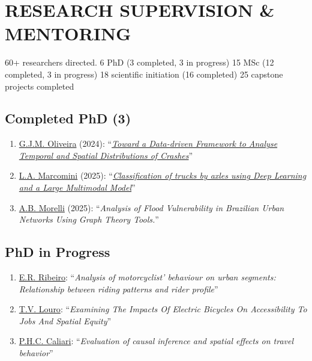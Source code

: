 \documentclass[
  10pt,
  a4paper,
  DIV=11,
  numbers=noendperiod]{scrartcl}
\providecommand{\tightlist}{%
  \setlength{\itemsep}{0pt}\setlength{\parskip}{0pt}}
\begin{document}
\hrulefill

\section{RESEARCH SUPERVISION \&
MENTORING}\label{research-supervision-mentoring}

\begin{description}
\tightlist
\item[\textbf{Summary}]
60+ researchers directed. 6 PhD (3 completed, 3 in progress) \textbar{}
15 MSc (12 completed, 3 in progress) \textbar{} 18 scientific initiation
(16 completed) \textbar{} 25 capstone projects completed
\end{description}

\subsection{Completed PhD (3)}\label{completed-phd-3}

\begin{enumerate}
\def\labelenumi{\arabic{enumi}.}
\item
  \href{}{G.J.M. Oliveira} (2024):
  ``\emph{\href{https://minerva-access.unimelb.edu.au/items/9d41c43a-a211-41ce-92fe-f081fc49e630}{Toward
  a Data-driven Framework to Analyse Temporal and Spatial Distributions
  of Crashes}}''
\item
  \href{https://scholar.google.com/citations?user=AcNWryQAAAAJ&hl=en}{L.A.
  Marcomini} (2025):
  ``\emph{\href{https://doi.org/10.11606/T.18.2025.tde-11022026-082130}{Classification
  of trucks by axles using Deep Learning and a Large Multimodal
  Model}}''
\item
  \href{https://scholar.google.com/citations?user=BqdPZ2gAAAAJ&hl=en}{A.B.
  Morelli} (2025): ``\emph{Analysis of Flood Vulnerability in Brazilian
  Urban Networks Using Graph Theory Tools.}''
\end{enumerate}

\subsection{PhD in Progress}\label{phd-in-progress}

\begin{enumerate}
\def\labelenumi{\arabic{enumi}.}
\item
  \href{https://scholar.google.com.br/citations?user=0r-M5IcAAAAJ}{E.R.
  Ribeiro}: ``\emph{Analysis of motorcyclist' behaviour on urban
  segments: Relationship between riding patterns and rider profile}''
\item
  \href{https://scholar.google.com.br/citations?user=ietBcOUAAAAJ}{T.V.
  Louro}: ``\emph{Examining The Impacts Of Electric Bicycles On
  Accessibility To Jobs And Spatial Equity}''
\item
  \href{https://scholar.google.com.br/citations?user=hy142eUAAAAJ}{P.H.C.
  Caliari}: ``\emph{Evaluation of causal inference and spatial effects
  on travel behavior}''
\end{enumerate}
\end{document}
